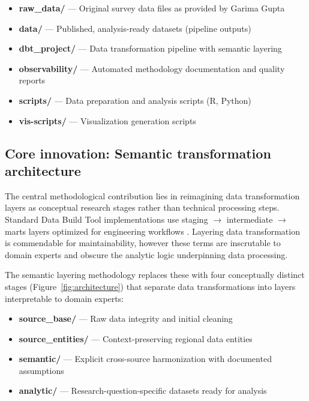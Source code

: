 \documentclass{article}
\begin{document}
\begin{itemize}
    \item \textbf{raw\_data/} — Original survey data files as provided by Garima Gupta
    \item \textbf{data/} — Published, analysis-ready datasets (pipeline outputs)
    \item \textbf{dbt\_project/} — Data transformation pipeline with semantic layering
    \item \textbf{observability/} — Automated methodology documentation and quality reports
    \item \textbf{scripts/} — Data preparation and analysis scripts (R, Python)
    \item \textbf{vis-scripts/} — Visualization generation scripts
\end{itemize}

\subsection{Core innovation: Semantic transformation architecture}
\label{subsec:core-innovation}

The central methodological contribution lies in reimagining data transformation layers as conceptual research stages rather than technical processing steps. Standard Data Build Tool implementations use staging $\to$ intermediate $\to$ marts layers optimized for engineering workflows \cite{dbt_docs_structure}. Layering data transformation is commendable for maintainability, however these terms are inscrutable to domain experts and obscure the analytic logic underpinning data processing.

The semantic layering methodology replaces these with four conceptually distinct stages (Figure~\ref{fig:architecture}) that separate  data transformations into layers interpretable to domain experts:

\begin{itemize}
    \item \textbf{source\_base/} — Raw data integrity and initial cleaning
    \item \textbf{source\_entities/} — Context-preserving regional data entities
    \item \textbf{semantic/} — Explicit cross-source harmonization with documented assumptions
    \item \textbf{analytic/} — Research-question-specific datasets ready for analysis
\end{itemize}
\end{document}
